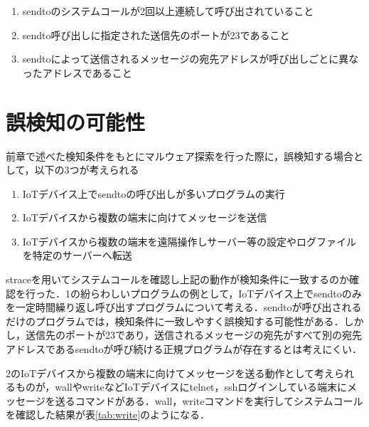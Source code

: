 \begin{enumerate}
\item sendtoのシステムコールが2回以上連続して呼び出されていること
\item sendto呼び出しに指定された送信先のポートが23であること
\item sendtoによって送信されるメッセージの宛先アドレスが呼び出しごとに異なったアドレスであること
\end{enumerate}


\section{誤検知の可能性}
前章で述べた検知条件をもとにマルウェア探索を行った際に，誤検知する場合として，以下の3つが考えられる

\begin{enumerate}
\item IoTデバイス上でsendtoの呼び出しが多いプログラムの実行
\item IoTデバイスから複数の端末に向けてメッセージを送信
\item IoTデバイスから複数の端末を遠隔操作しサーバー等の設定やログファイルを特定のサーバーへ転送
\end{enumerate}
straceを用いてシステムコールを確認し上記の動作が検知条件に一致するのか確認を行った．1の紛らわしいプログラムの例として，IoTデバイス上でsendtoのみを一定時間繰り返し呼び出すプログラムについて考える．sendtoが呼び出されるだけのプログラムでは，検知条件に一致しやすく誤検知する可能性がある．しかし，送信先のポートが23であり，送信されるメッセージの宛先がすべて別の宛先アドレスであるsendtoが呼び続ける正規プログラムが存在するとは考えにくい．\par
2のIoTデバイスから複数の端末に向けてメッセージを送る動作として考えられるものが，wallやwriteなどIoTデバイスにtelnet，sshログインしている端末にメッセージを送るコマンドがある．wall，writeコマンドを実行してシステムコールを確認した結果が表\ref{tab:write}のようになる．
